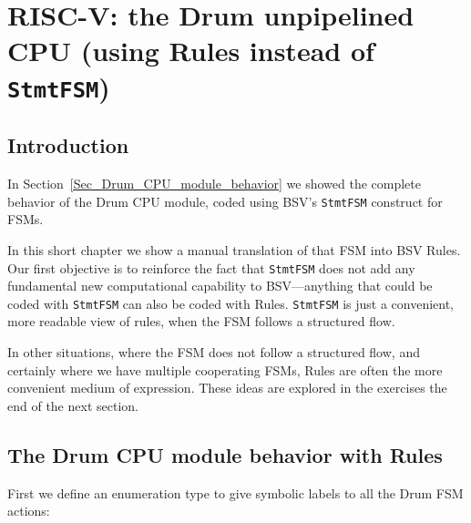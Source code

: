 

\chapter{RISC-V: the Drum unpipelined CPU (using Rules instead of {\tt StmtFSM})}


\setcounter{page}{1}
\renewcommand{\thepage}{\arabic{chapter}-\arabic{page}}

\label{ch_Drum_Rules}


\section{Introduction}

In Section~\ref{Sec_Drum_CPU_module_behavior} we showed the complete
behavior of the Drum CPU module, coded using BSV's \verb|StmtFSM|
construct for FSMs.

In this short chapter we show a manual translation of that FSM into
BSV Rules.  Our first objective is to reinforce the fact that
\verb|StmtFSM| does not add any fundamental new computational
capability to BSV---anything that could be coded with \verb|StmtFSM|
can also be coded with Rules.  \verb|StmtFSM| is just a convenient,
more readable view of rules, when the FSM follows a structured flow.

In other situations, where the FSM does not follow a structured flow,
and certainly where we have multiple cooperating FSMs, Rules are often
the more convenient medium of expression.  These ideas are explored in
the exercises the end of the next section.


\section{The Drum CPU module behavior with Rules}

First we define an enumeration type to give symbolic labels to all the
Drum FSM actions:


